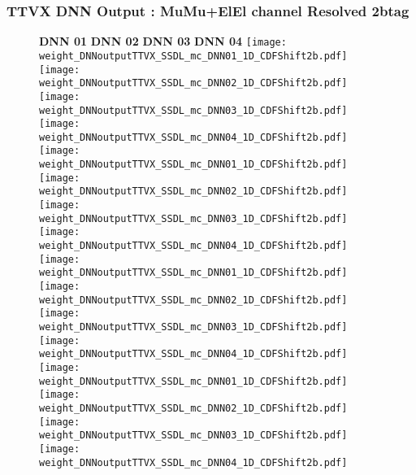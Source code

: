 \documentclass[9pt]{beamer}
\begin{document}
\begin{frame}
	\frametitle{TTVX DNN Output : MuMu+ElEl channel Resolved 2btag}
	\begin{figure}
	    \textbf{DNN 01} \hspace{1.2cm} \textbf{DNN 02} \hspace{1.2cm} \textbf{DNN 03} \hspace{1.2cm} \textbf{DNN 04}
        \centering
		\texttt{[image: weight\_DNNoutputTTVX\_SSDL\_mc\_DNN01\_1D\_CDFShift2b.pdf]}
		\texttt{[image: weight\_DNNoutputTTVX\_SSDL\_mc\_DNN02\_1D\_CDFShift2b.pdf]}
		\texttt{[image: weight\_DNNoutputTTVX\_SSDL\_mc\_DNN03\_1D\_CDFShift2b.pdf]}
		\texttt{[image: weight\_DNNoutputTTVX\_SSDL\_mc\_DNN04\_1D\_CDFShift2b.pdf]}\\
		\texttt{[image: weight\_DNNoutputTTVX\_SSDL\_mc\_DNN01\_1D\_CDFShift2b.pdf]}
		\texttt{[image: weight\_DNNoutputTTVX\_SSDL\_mc\_DNN02\_1D\_CDFShift2b.pdf]}
		\texttt{[image: weight\_DNNoutputTTVX\_SSDL\_mc\_DNN03\_1D\_CDFShift2b.pdf]}
		\texttt{[image: weight\_DNNoutputTTVX\_SSDL\_mc\_DNN04\_1D\_CDFShift2b.pdf]}\\
		\texttt{[image: weight\_DNNoutputTTVX\_SSDL\_mc\_DNN01\_1D\_CDFShift2b.pdf]}
		\texttt{[image: weight\_DNNoutputTTVX\_SSDL\_mc\_DNN02\_1D\_CDFShift2b.pdf]}
		\texttt{[image: weight\_DNNoutputTTVX\_SSDL\_mc\_DNN03\_1D\_CDFShift2b.pdf]}
		\texttt{[image: weight\_DNNoutputTTVX\_SSDL\_mc\_DNN04\_1D\_CDFShift2b.pdf]}\\
		\texttt{[image: weight\_DNNoutputTTVX\_SSDL\_mc\_DNN01\_1D\_CDFShift2b.pdf]}
		\texttt{[image: weight\_DNNoutputTTVX\_SSDL\_mc\_DNN02\_1D\_CDFShift2b.pdf]}
		\texttt{[image: weight\_DNNoutputTTVX\_SSDL\_mc\_DNN03\_1D\_CDFShift2b.pdf]}
		\texttt{[image: weight\_DNNoutputTTVX\_SSDL\_mc\_DNN04\_1D\_CDFShift2b.pdf]}\\
	\end{figure}
\end{frame}
\end{document}
